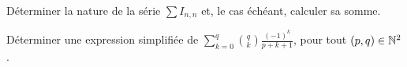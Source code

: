 \begin{exercice}
    Déterminer la nature de la série $\sum I_{n,n}$ et, le cas échéant, calculer sa somme. 
\end{exercice}

\begin{exercice}
    Déterminer une expression simplifiée de $\sum\limits_{k=0}^q \binom{q}{k} \frac{(-1)^k}{p+k+1}$, pour tout $(p, q) \in \mathbb{N}^2$.
\end{exercice}

\begin{solution}
\end{solution}
